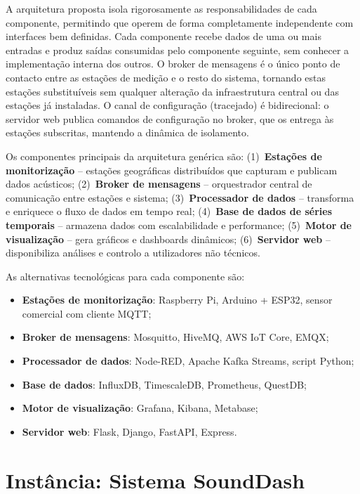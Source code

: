 \documentclass[12pt,a4paper]{report}
\begin{document}
A arquitetura proposta isola rigorosamente as responsabilidades de cada componente, permitindo que operem de forma completamente independente com interfaces bem definidas. Cada componente recebe dados de uma ou mais entradas e produz saídas consumidas pelo componente seguinte, sem conhecer a implementação interna dos outros. O broker de mensagens é o único ponto de contacto entre as estações de medição e o resto do sistema, tornando estas estações substituíveis sem qualquer alteração da infraestrutura central ou das estações já instaladas. O canal de configuração (tracejado) é bidirecional: o servidor web publica comandos de configuração no broker, que os entrega às estações subscritas, mantendo a dinâmica de isolamento.

Os componentes principais da arquitetura genérica são: (1)~\textbf{Estações de monitorização} -- estações geográficas distribuídos que capturam e publicam dados acústicos; (2)~\textbf{Broker de mensagens} -- orquestrador central de comunicação entre estações e sistema; (3)~\textbf{Processador de dados} -- transforma e enriquece o fluxo de dados em tempo real; (4)~\textbf{Base de dados de séries temporais} -- armazena dados com escalabilidade e performance; (5)~\textbf{Motor de visualização} -- gera gráficos e dashboards dinâmicos; (6)~\textbf{Servidor web} -- disponibiliza análises e controlo a utilizadores não técnicos.

As alternativas tecnológicas para cada componente são:

\begin{itemize}[nosep]
  \item \textbf{Estações de monitorização}: Raspberry Pi, Arduino + ESP32, sensor comercial com cliente MQTT;
  \item \textbf{Broker de mensagens}: Mosquitto, HiveMQ, AWS IoT Core, EMQX;
  \item \textbf{Processador de dados}: Node-RED, Apache Kafka Streams, script Python;
  \item \textbf{Base de dados}: InfluxDB, TimescaleDB, Prometheus, QuestDB;
  \item \textbf{Motor de visualização}: Grafana, Kibana, Metabase;
  \item \textbf{Servidor web}: Flask, Django, FastAPI, Express.
\end{itemize}

\section{Instância: Sistema SoundDash}
\label{sec:instancia}
\end{document}
